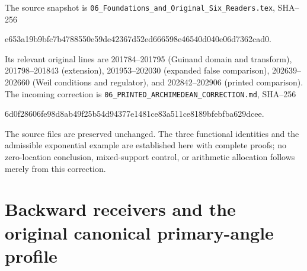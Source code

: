 The source snapshot is
\texttt{06\_Foundations\_and\_Original\_Six\_Readers.tex}, SHA--256
\begin{center}\small\ttfamily
e653a19b9bfc7b4788550e59de42367d52ed666598e46540d040e06d7362cad0.
\end{center}
Its relevant original lines are 201784--201795 (Guinand domain and
transform), 201798--201843 (extension), 201953--202030 (expanded false
comparison), 202639--202660 (Weil conditions and regulator), and
202842--202906 (printed comparison).  The incoming correction is
\texttt{06\_PRINTED\_ARCHIMEDEAN\_CORRECTION.md}, SHA--256
\begin{center}\small\ttfamily
6d0f28606fe98d8ab49f25b54d94377e1481ce83a511ce8189bfebfba629dcee.
\end{center}
The source files are preserved unchanged.  The three functional identities
and the admissible exponential example are established here with complete
proofs; no zero-location conclusion, mixed-support control, or arithmetic
allocation follows merely from this correction.



\endgroup

\clearpage
\begingroup
\def\C{\mathbb C}
\def\Tr{\operatorname{Tr}}
\def\dd{\,d}
\def\im{\operatorname{im}}

\setcounter{equation}{0}
\renewcommand{\theequation}{A03ARU.\arabic{equation}}
\section*{Backward receivers and the original canonical primary-angle profile}


